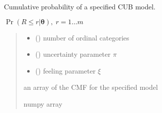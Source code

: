 \documentclass[letterpaper,10pt,english]{sphinxmanual}
\begin{document}
\begin{fulllineitems}
\label{\detokenize{cubmods:cubmods.cub.cmf}}
\pysigstartsignatures
{}
\pysigstopsignatures
\sphinxAtStartPar
Cumulative probability of a specified CUB model.

\sphinxAtStartPar
\(\Pr(R \leq r | \pmb\theta),\; r=1 \ldots m\)
\begin{quote}\begin{description}
\begin{itemize}
\item {} 
\sphinxAtStartPar
{} () \textendash{} number of ordinal categories

\item {} 
\sphinxAtStartPar
{} () \textendash{} uncertainty parameter \(\pi\)

\item {} 
\sphinxAtStartPar
{} () \textendash{} feeling parameter \(\xi\)

\end{itemize}

\sphinxAtStartPar
an array of the CMF for the specified model

\sphinxAtStartPar
numpy array

\end{description}\end{quote}

\end{fulllineitems}

\end{document}
